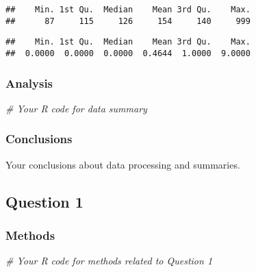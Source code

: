 \documentclass[
]{article}
\newenvironment{Shaded}{\begin{snugshade}}{\end{snugshade}}
\newcommand{\CommentTok}[1]{\textcolor[rgb]{0.56,0.35,0.01}{\textit{#1}}}
\newcommand{\FunctionTok}[1]{\textcolor[rgb]{0.13,0.29,0.53}{\textbf{#1}}}
\newcommand{\NormalTok}[1]{#1}
\newcommand{\OtherTok}[1]{\textcolor[rgb]{0.56,0.35,0.01}{#1}}
\newcommand{\SpecialCharTok}[1]{\textcolor[rgb]{0.81,0.36,0.00}{\textbf{#1}}}
\begin{document}
\begin{verbatim}
##    Min. 1st Qu.  Median    Mean 3rd Qu.    Max. 
##      87     115     126     154     140     999
\end{verbatim}

\begin{Shaded}
\end{Shaded}

\begin{verbatim}
##    Min. 1st Qu.  Median    Mean 3rd Qu.    Max. 
##  0.0000  0.0000  0.0000  0.4644  1.0000  9.0000
\end{verbatim}

\subsubsection{Analysis}\label{analysis}

\begin{Shaded}
\begin{Highlighting}[]
\CommentTok{\# Your R code for data summary}
\end{Highlighting}
\end{Shaded}

\subsubsection{Conclusions}\label{conclusions}

Your conclusions about data processing and summaries.

\subsection{Question 1}\label{question-1}

\subsubsection{Methods}\label{methods-1}

\begin{Shaded}
\begin{Highlighting}[]
\CommentTok{\# Your R code for methods related to Question 1}
\end{Highlighting}
\end{Shaded}
\end{document}
